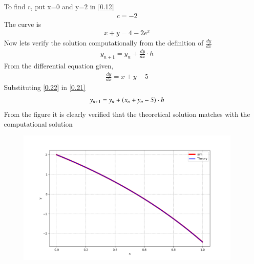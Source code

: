 \documentclass[journal]{IEEEtran}
\begin{document}
To find c, put x=0 and y=2 in \ref{0.12}
\begin{align}
    c = -2  
\end{align}
The curve is 
\begin{align}
   x+y = 4 -2e^x
\end{align}
Now lets verify the solution computationally from the definition of $\frac{dy}{dx}$
\begin{align}
    y_{n+1}= y_{n} + \frac{dy}{dx} \cdot h
    \label{0.21}
\end{align}
From the differential equation given,
\begin{align}
    \frac{dy}{dx} = x+y-5
    \label{0.22}
\end{align}
Substituting \ref{0.22} in \ref{0.21}
\begin{align}
    y_{n+1} = y_n + \left(x_n + y_n -5\right) \cdot h 
\end{align}
From the figure it is clearly verified that the theoretical solution matches with the computational solution
\begin{figure}
    \centering
    \includegraphics[width=\columnwidth]{figs/Figure_1.png}
\end{figure}
\end{document}
